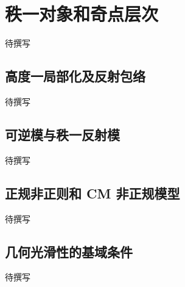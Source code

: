 
% 
% 
% 

\section{秩一对象和奇点层次}
\label{g5:sec:0906}

待撰写

\subsection{高度一局部化及反射包络}
\label{g5:subsec:0906:01}
待撰写

\subsection{可逆模与秩一反射模}
\label{g5:subsec:0906:02}
待撰写

\subsection{正规非正则和 CM 非正规模型}
\label{g5:subsec:0906:03}
待撰写

\subsection{几何光滑性的基域条件}
\label{g5:subsec:0906:04}
待撰写
